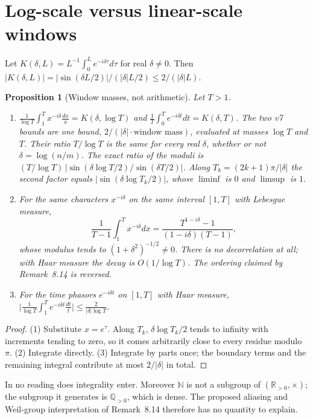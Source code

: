 \documentclass[11pt]{article}
\newtheorem{proposition}[theorem]{Proposition}
\theoremstyle{definition}\newtheorem{definition}[theorem]{Definition}
\theoremstyle{remark}\newtheorem{remark}[theorem]{Remark}
\newcommand{\R}{\mathbb R}\newcommand{\C}{\mathbb C}\newcommand{\Z}{\mathbb Z}
\newcommand{\Q}{\mathbb Q}
\begin{document}
\section{Log-scale versus linear-scale windows}\label{sec:windows}
Let $K(\delta,L)=L^{-1}\int_0^Le^{-i\delta\tau}d\tau$ for real $\delta\neq0$. Then
$|K(\delta,L)|=|\sin(\delta L/2)|/(|\delta|L/2)\leq2/(|\delta|L)$.

\begin{proposition}[Window masses, not arithmetic]\label{prop:windows}
Let $T>1$.
\begin{enumerate}
\item $\frac1{\log T}\int_1^Tx^{-i\delta}\frac{dx}x=K(\delta,\log T)$ and
$\frac1T\int_0^Te^{-i\delta t}dt=K(\delta,T)$. The two v7 bounds are one bound,
$2/(|\delta|\cdot\text{window mass})$, evaluated at masses $\log T$ and $T$.
Their ratio $T/\log T$ is the same for every real $\delta$, whether or not
$\delta=\log(n/m)$. The exact ratio of the moduli is
$(T/\log T)\,|\sin(\delta\log T/2)/\sin(\delta T/2)|$. Along
$T_k=(2k+1)\pi/|\delta|$ the second factor equals $|\sin(\delta\log T_k/2)|$,
whose $\liminf$ is $0$ and $\limsup$ is $1$.
\item For the same characters $x^{-i\delta}$ on the same interval $[1,T]$ with
Lebesgue measure,
\[
 \frac1{T-1}\int_1^Tx^{-i\delta}dx=\frac{T^{1-i\delta}-1}{(1-i\delta)(T-1)},
\]
whose modulus tends to $(1+\delta^2)^{-1/2}\neq0$. There is no decorrelation at
all; with Haar measure the decay is $O(1/\log T)$. The ordering claimed by
Remark~8.14 is reversed.
\item For the time phasors $e^{-i\delta t}$ on $[1,T]$ with Haar measure,
$\bigl|\frac1{\log T}\int_1^Te^{-i\delta t}\frac{dt}t\bigr|\leq\frac2{|\delta|\log T}$.
\end{enumerate}
\end{proposition}
\begin{proof}
(1) Substitute $x=e^\tau$. Along $T_k$, $\delta\log T_k/2$ tends to infinity
with increments tending to zero, so it comes arbitrarily close to every residue
modulo $\pi$. (2) Integrate directly. (3) Integrate by parts once; the boundary
terms and the remaining integral contribute at most $2/|\delta|$ in total.
\end{proof}

In no reading does integrality enter. Moreover $\mathbb N$ is not a subgroup
of $(\R_{>0},\times)$; the subgroup it generates is $\Q_{>0}$, which is dense.
The proposed aliasing and Weil-group interpretation of Remark~8.14 therefore
has no quantity to explain.
\end{document}
